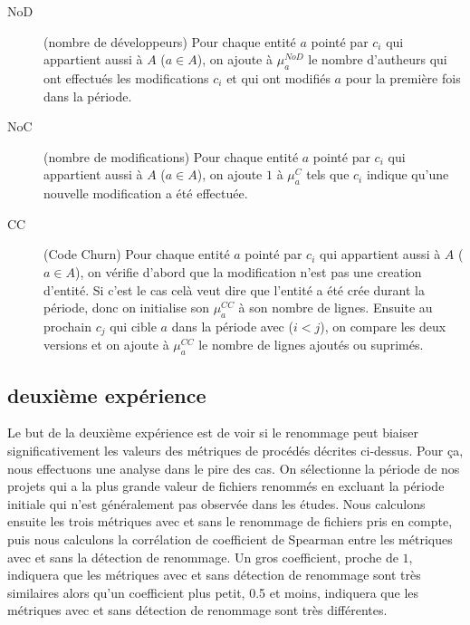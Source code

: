 \begin{description}
	\item[NoD] (nombre de développeurs) Pour chaque entité $a$ pointé par $c_i$ qui appartient aussi à $A$ ($a \in A$), on ajoute à $\mu_{a}^{NoD}$ le nombre d'autheurs qui ont effectués les modifications $c_i$ et qui ont modifiés $a$ pour la première fois dans la période.
	\item[NoC] (nombre de modifications) Pour chaque entité $a$ pointé par $c_i$ qui appartient aussi à $A$ ($a \in A$), on ajoute $1$ à $\mu_{a}^{C}$ tels que $c_i$ indique qu'une nouvelle modification a été effectuée.
	\item[CC] (Code Churn) Pour chaque entité $a$ pointé par $c_i$ qui appartient aussi à $A$ ($a \in A$), on vérifie d'abord que la modification n'est pas une creation d'entité. Si c'est le cas celà veut dire que l'entité a été crée durant la période, donc on initialise son $\mu_{a}^{CC}$ à son nombre de lignes. Ensuite au prochain $c_j$ qui cible $a$ dans la période avec ($i < j$), on compare les deux versions et on ajoute à $\mu_{a}^{CC}$ le nombre de lignes ajoutés ou suprimés.
\end{description}


\subsection{deuxième expérience}

Le but de la deuxième expérience est de voir si le renommage peut biaiser significativement les valeurs des métriques de procédés décrites ci-dessus. Pour ça, nous effectuons une analyse dans le pire des cas. On sélectionne la période de nos projets qui a la plus grande valeur de fichiers renommés en excluant la période initiale qui n'est généralement pas observée dans les études. Nous calculons ensuite les trois métriques avec et sans le renommage de fichiers pris en compte, puis nous calculons la corrélation de coefficient de Spearman entre les métriques avec et sans la détection de renommage. Un gros coefficient, proche de $1$, indiquera que les métriques avec et sans détection de renommage sont très similaires alors qu'un coefficient plus petit, 0.5 et moins, indiquera que les métriques avec et sans détection de renommage sont très différentes.\\ 
